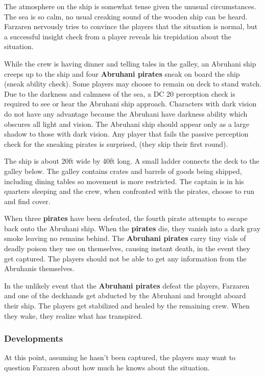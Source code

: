 \begin{multicols*}{2}
The atmosphere on the ship is somewhat tense given the unusual circumstances. The sea is so calm, no usual creaking sound of the wooden ship can be heard. Farzaren nervously tries to convince the players that the situation is normal, but a successful insight check from a player reveals his trepidation about the situation. 

While the crew is having dinner and telling tales in the galley, an Abruhani ship creeps up to the ship and four \textbf{Abruhani pirates} sneak on board the ship (sneak ability check). Some players may choose to remain on deck to stand watch. Due to the darkness and calmness of the sea, a DC 20 perception check is required to see or hear the Abruhani ship approach. Characters with dark vision do not have any advantage because the Abruhani have darkness ability which obscures all light and vision. The Abruhani ship should appear only as a large shadow to those with dark vision. Any player that fails the passive perception check for the sneaking pirates is surprised, (they skip their first round).

The ship is about 20ft wide by 40ft long. A small ladder connects the deck to the galley below. The galley contains crates and barrels of goods being shipped, including dining tables so movement is more restricted. The captain is in his quarters sleeping and the crew, when confronted with the pirates, choose to run and find cover.

When three \textbf{pirates} have been defeated, the fourth pirate attempts to escape back onto the Abruhani ship. When the \textbf{pirates} die, they vanish into a dark gray smoke leaving no remains behind. The \textbf{Abruhani pirates} carry tiny vials of deadly poison they use on themselves, causing instant death, in the event they get captured. The players should not be able to get any information from the Abruhanis themselves.

In the unlikely event that the  \textbf{Abruhani pirates} defeat the players, Farzaren and one of the deckhands get abducted by the Abruhani and brought aboard their ship. The players get stabilized and healed by the remaining crew. When they wake, they realize what has transpired.

\subsubsection*{Developments}

At this point, assuming he hasn’t been captured, the players may want to question Farzaren about how much he knows about the situation. 
\break


\end{multicols*}
